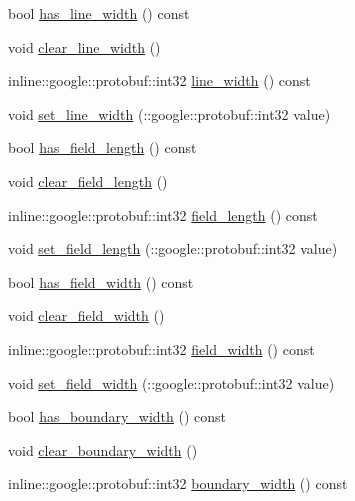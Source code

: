 \begin{DoxyCompactItemize}
\item 
bool \hyperlink{class_s_s_l___geometry_field_size_ae2aa00b16362b964090745ee1ab03f79}{has\-\_\-line\-\_\-width} () const 
\item 
void \hyperlink{class_s_s_l___geometry_field_size_a7a3b4fa7f48d2c955e6c0afa83495b5d}{clear\-\_\-line\-\_\-width} ()
\item 
inline\-::google\-::protobuf\-::int32 \hyperlink{class_s_s_l___geometry_field_size_a106c271188b19289366af90024296955}{line\-\_\-width} () const 
\item 
void \hyperlink{class_s_s_l___geometry_field_size_a7253581836906f68221baa28f2de73a1}{set\-\_\-line\-\_\-width} (\-::google\-::protobuf\-::int32 value)
\item 
bool \hyperlink{class_s_s_l___geometry_field_size_ab731c1351313cefcc6f66abb818f7d07}{has\-\_\-field\-\_\-length} () const 
\item 
void \hyperlink{class_s_s_l___geometry_field_size_a95636e9b40c2ea9873d6f48d9c70eef8}{clear\-\_\-field\-\_\-length} ()
\item 
inline\-::google\-::protobuf\-::int32 \hyperlink{class_s_s_l___geometry_field_size_a90ee5792ed94330c951db0f0f75cdd93}{field\-\_\-length} () const 
\item 
void \hyperlink{class_s_s_l___geometry_field_size_a4203b540e7493a97306dc942c53cd700}{set\-\_\-field\-\_\-length} (\-::google\-::protobuf\-::int32 value)
\item 
bool \hyperlink{class_s_s_l___geometry_field_size_a6da5d02a14b102e9b567edc760eec2a6}{has\-\_\-field\-\_\-width} () const 
\item 
void \hyperlink{class_s_s_l___geometry_field_size_a39adf44fbe1108d131036114f04b9c2e}{clear\-\_\-field\-\_\-width} ()
\item 
inline\-::google\-::protobuf\-::int32 \hyperlink{class_s_s_l___geometry_field_size_a63227f3667804c886346fce4fc0540cd}{field\-\_\-width} () const 
\item 
void \hyperlink{class_s_s_l___geometry_field_size_a1ea3e6b3967ff6a2c363831e77ae8573}{set\-\_\-field\-\_\-width} (\-::google\-::protobuf\-::int32 value)
\item 
bool \hyperlink{class_s_s_l___geometry_field_size_a0836d0ac0e6fba5fa4650c9bb7d73990}{has\-\_\-boundary\-\_\-width} () const 
\item 
void \hyperlink{class_s_s_l___geometry_field_size_a6cbe06b3f00575d69a4f30b5909ceac1}{clear\-\_\-boundary\-\_\-width} ()
\item 
inline\-::google\-::protobuf\-::int32 \hyperlink{class_s_s_l___geometry_field_size_ae1e56f0d29d86288fd28b90092aa9290}{boundary\-\_\-width} () const 

\end{DoxyCompactItemize}
